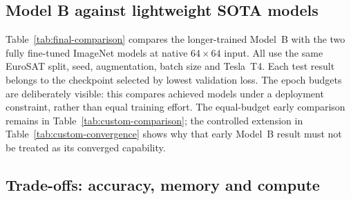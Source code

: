 
\subsection{Model B against lightweight SOTA models}
\label{sec:final-comparison}

Table~\ref{tab:final-comparison} compares the longer-trained Model~B with
the two fully fine-tuned ImageNet models at native $64\times64$ input.
All use the same EuroSAT split, seed, augmentation, batch size and Tesla~T4.
Each test result belongs to the checkpoint selected by lowest validation
loss. The epoch budgets are deliberately visible: this compares achieved
models under a deployment constraint, rather than equal training effort.
The equal-budget early comparison remains in
Table~\ref{tab:custom-comparison}; the controlled extension in
Table~\ref{tab:custom-convergence} shows why that early Model~B result must
not be treated as its converged capability.

\begin{table}[htbp]
  \centering
  \footnotesize
  \setlength{\tabcolsep}{4pt}
  
  \caption{Model~B trained from scratch against fully fine-tuned SOTA models.
  Storage is measured saved-state size in KiB ($1024$ bytes), including
  serialization overhead; M denotes $10^6$ MACs per image. Epoch time is
  the training pass only on a Tesla~T4, not edge inference latency.}
  \label{tab:final-comparison}
\end{table}

\subsection{Trade-offs: accuracy, memory and compute}
\label{sec:trade-offs}

